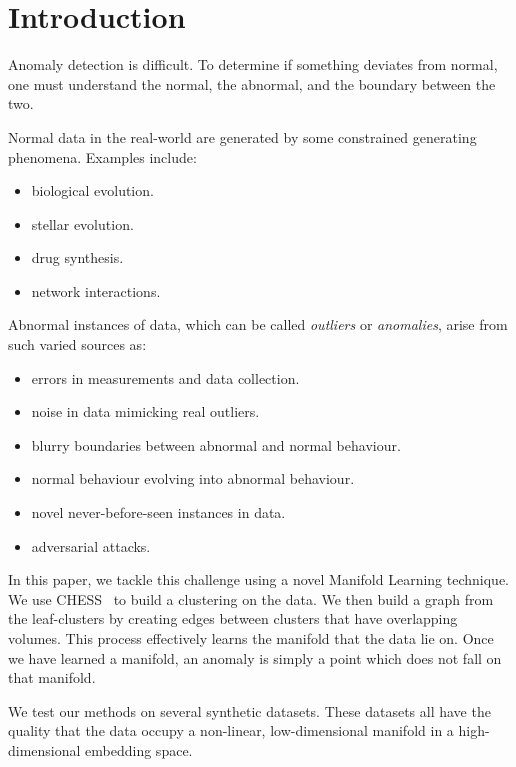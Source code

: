 \section{Introduction}
\label{sec:introduction}

Anomaly detection is difficult.
To determine if something deviates from normal, one must understand the normal, the abnormal, and the boundary between the two.

Normal data in the real-world are generated by some constrained generating phenomena.
Examples include:
\begin{itemize}
    \item biological evolution.
    \item stellar evolution.
    \item drug synthesis.
    \item network interactions.
\end{itemize}

Abnormal instances of data, which can be called \textit{outliers} or \textit{anomalies}, arise from such varied sources as:
\begin{itemize}
    \item errors in measurements and data collection.
    \item noise in data mimicking real outliers.
    \item blurry boundaries between abnormal and normal behaviour.
    \item normal behaviour evolving into abnormal behaviour.
    \item novel never-before-seen instances in data.
    \item adversarial attacks.
\end{itemize}

In this paper, we tackle this challenge using a novel Manifold Learning technique.
We use CHESS~\cite{CHESS} to build a clustering on the data.
We then build a graph from the leaf-clusters by creating edges between clusters that have overlapping volumes.
This process effectively learns the manifold that the data lie on.
Once we have learned a manifold, an anomaly is simply a point which does not fall on that manifold.

We test our methods on several synthetic datasets. These datasets all have the quality that the data occupy a non-linear, low-dimensional manifold in a high-dimensional embedding space.

